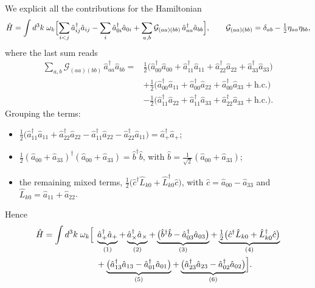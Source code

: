 \documentclass[12pt,a4paper,oneside]{article}
\numberwithin{equation}{section}   %
\begin{document}
We explicit all the contributions for the Hamiltonian
\begin{equation}
\hat H=\int d^3k\;\omega_k\Bigl[\sum_{i<j}\hat a^\dagger_{ij}\hat a_{ij}
-\sum_i\hat a^\dagger_{0i}\hat a_{0i}
+\sum_{a,b}\mathcal G_{(aa)(bb)}\,\hat a^\dagger_{aa}\hat a_{bb}\Bigr],
\qquad
\mathcal G_{(aa)(bb)}=\delta_{ab}-\tfrac12\eta_{aa}\eta_{bb},
\end{equation}
where the last sum reads
\begin{equation}
\begin{split}
\sum_{a,b}\mathcal G_{(aa)(bb)}\,\hat a^\dagger_{aa}\hat a_{bb}
={}&\tfrac12\bigl(\hat a^\dagger_{00}\hat a_{00}+\hat a^\dagger_{11}\hat a_{11}
+\hat a^\dagger_{22}\hat a_{22}+\hat a^\dagger_{33}\hat a_{33}\bigr)\\
&+\tfrac12\bigl(\hat a^\dagger_{00}\hat a_{11}+\hat a^\dagger_{00}\hat a_{22}
+\hat a^\dagger_{00}\hat a_{33}+\text{h.c.}\bigr)\\
&-\tfrac12\bigl(\hat a^\dagger_{11}\hat a_{22}+\hat a^\dagger_{11}\hat a_{33}
+\hat a^\dagger_{22}\hat a_{33}+\text{h.c.}\bigr).
\end{split}
\end{equation}
Grouping the terms:
\begin{itemize}
\item $\tfrac12\bigl(\hat a^\dagger_{11}\hat a_{11}+\hat a^\dagger_{22}\hat a_{22}
-\hat a^\dagger_{11}\hat a_{22}-\hat a^\dagger_{22}\hat a_{11}\bigr)
=\hat a_+^\dagger\hat a_+$;
\item $\tfrac12(\hat a_{00}+\hat a_{33})^\dagger(\hat a_{00}+\hat a_{33})
=\hat b^\dagger\hat b$, with $\hat b=\tfrac{1}{\sqrt2}(\hat a_{00}+\hat a_{33})$;
\item the remaining mixed terms,
$\tfrac12\bigl(\hat c^\dagger\hat L_{k0}+\hat L^\dagger_{k0}\hat c\bigr)$, with
$\hat c=\hat a_{00}-\hat a_{33}$ and $\hat L_{k0}=\hat a_{11}+\hat a_{22}$.
\end{itemize}
Hence
\begin{equation}
\begin{split}
\hat H=\int d^3k\;\omega_k\Bigl[\;
&\underbrace{\hat a_+^\dagger\hat a_+}_{(1)}
+\underbrace{\hat a_\times^\dagger\hat a_\times}_{(2)}
+\underbrace{\bigl(\hat b^\dagger\hat b-\hat a^\dagger_{03}\hat a_{03}\bigr)}_{(3)}
+\underbrace{\tfrac12\bigl(\hat c^\dagger\hat L_{k0}+\hat L^\dagger_{k0}\hat c\bigr)}_{(4)}\\
&+\underbrace{\bigl(\hat a^\dagger_{13}\hat a_{13}-\hat a^\dagger_{01}\hat a_{01}\bigr)}_{(5)}
+\underbrace{\bigl(\hat a^\dagger_{23}\hat a_{23}-\hat a^\dagger_{02}\hat a_{02}\bigr)}_{(6)}
\Bigr].
\end{split}
\end{equation}
\end{document}
